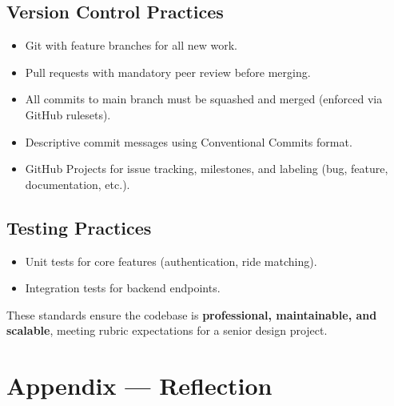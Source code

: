 \documentclass{article}
\begin{document}
\subsection*{Version Control Practices}
\begin{itemize}
    \item Git with feature branches for all new work.
    \item Pull requests with mandatory peer review before merging.
    \item All commits to main branch must be squashed and merged (enforced via GitHub rulesets).
    \item Descriptive commit messages using Conventional Commits format.
    \item GitHub Projects for issue tracking, milestones, and labeling (bug, feature, documentation, etc.).
\end{itemize}

\subsection*{Testing Practices}
\begin{itemize}
    \item Unit tests for core features (authentication, ride matching).
    \item Integration tests for backend endpoints.
\end{itemize}

These standards ensure the codebase is \textbf{professional, maintainable, and scalable}, meeting rubric expectations for a senior design project.

\newpage{}

\section*{Appendix --- Reflection}


\end{document}
